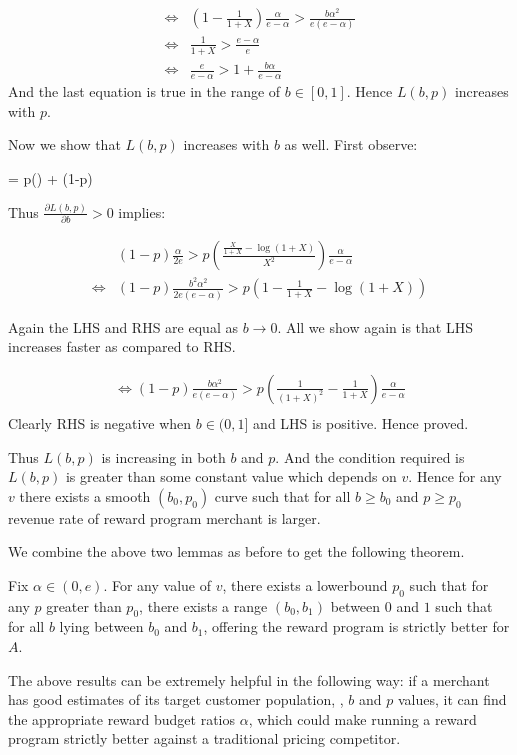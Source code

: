 \begin{align*}
\Leftrightarrow & \left(1 - \frac{1}{1+X}\right) \frac{\alpha}{e-\alpha} > \frac{b\alpha^2}{e(e-\alpha)}\\
\Leftrightarrow & \frac{1}{1+X} > \frac{e-\alpha}{e}\\
\Leftrightarrow & \frac{e}{e-\alpha} > 1 + \frac{b\alpha}{e-\alpha}
\end{align*}
And the last equation is true in the range of $b\in [0,1]$. Hence $L(b,p)$ increases with $p$.

Now we show that $L(b,p)$ increases with $b$ as well. First observe:

\beq
{} = p\left(\right) + (1-p)
\notag
\eeq

Thus $\frac{\partial L(b,p)}{\partial b} > 0$ implies:

\begin{align*}
& (1-p)\frac{\alpha}{2e} > p\left(\frac{\frac{X}{1+X} - \log(1+X)}{X^2}\right)\frac{\alpha}{e-\alpha}\\
\Leftrightarrow & (1-p)\frac{b^2\alpha^2}{2e(e-\alpha)} > p \left(1 - \frac{1}{1+X} - \log(1+X)\right)
\end{align*}

Again the LHS and RHS are equal as $b\rightarrow 0$. All we show again is that LHS increases faster as compared to RHS.

\begin{align*}
\Leftrightarrow (1-p)\frac{b\alpha^2}{e(e-\alpha)} > p\left(\frac{1}{(1+X)^2} - \frac{1}{1+X} \right)\frac{\alpha}{e-\alpha}\\
\end{align*}
Clearly RHS is negative when $b\in (0,1]$ and LHS is positive. Hence proved.

Thus $L(b,p)$ is increasing in both $b$ and $p$. And the condition required is $L(b,p)$ is greater than some constant value which depends on $v$.
Hence for any $v$ there exists a smooth $(b_0,p_0)$ curve such that for all $b\ge b_0$ and $p\ge p_0$ revenue rate of reward program merchant is larger.

\endproof

We combine the above two lemmas as before to get the following theorem.

\begin{theorem}
Fix $\alpha \in (0, e)$. 
For any value of $v$, there exists a lowerbound $p_0$ such that for any $p$ greater than $p_0$, there exists a range $(b_0, b_1)$ between $0$ and $1$ such that for all $b$ lying between $b_0$ and $b_1$, offering the reward program is strictly better for $A$. 
\end{theorem}

The above results can be extremely helpful in the following way: if a merchant has good estimates of its target customer population, \ie, $b$ and $p$ values, it can find the appropriate reward budget ratios $\alpha$, which could make running a reward program strictly better against a traditional pricing competitor.
